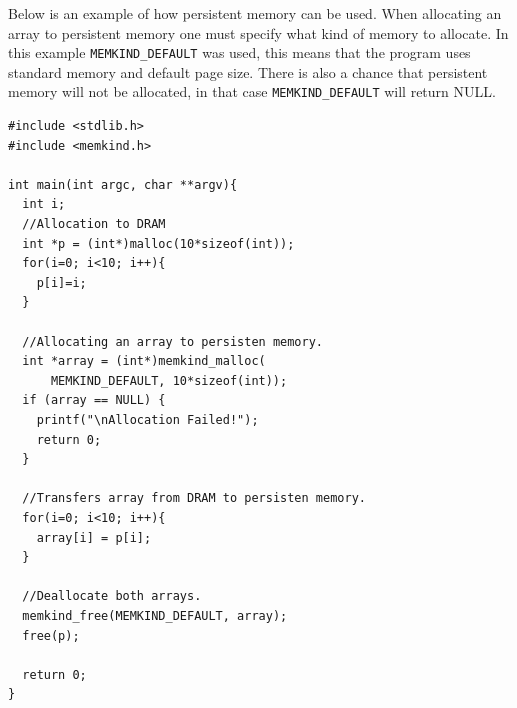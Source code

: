 \documentclass[12pt,a4paper,UKenglish]{article}
\begin{document}
\newline\newline
Below is an example of how persistent memory can be used. When allocating an array to persistent memory one must specify what kind of memory to allocate. In this example \texttt{MEMKIND\_DEFAULT}\cite{memkindlib} was used, this means that the program uses standard memory and default page size. There is also a chance that persistent memory will not be allocated, in that case \texttt{MEMKIND\_DEFAULT} will return NULL.
\lstset{language=C}
\begin{lstlisting}
#include <stdlib.h>
#include <memkind.h>

int main(int argc, char **argv){
  int i;
  //Allocation to DRAM
  int *p = (int*)malloc(10*sizeof(int));
  for(i=0; i<10; i++){
    p[i]=i;
  }
  
  //Allocating an array to persisten memory.
  int *array = (int*)memkind_malloc(
      MEMKIND_DEFAULT, 10*sizeof(int));
  if (array == NULL) {
    printf("\nAllocation Failed!");
    return 0;
  }
	
  //Transfers array from DRAM to persisten memory.
  for(i=0; i<10; i++){
    array[i] = p[i];
  }
  
  //Deallocate both arrays.
  memkind_free(MEMKIND_DEFAULT, array);
  free(p);
	
  return 0;
}
\end{lstlisting}

\nocite{*}
%
\printbibliography
\end{document}
